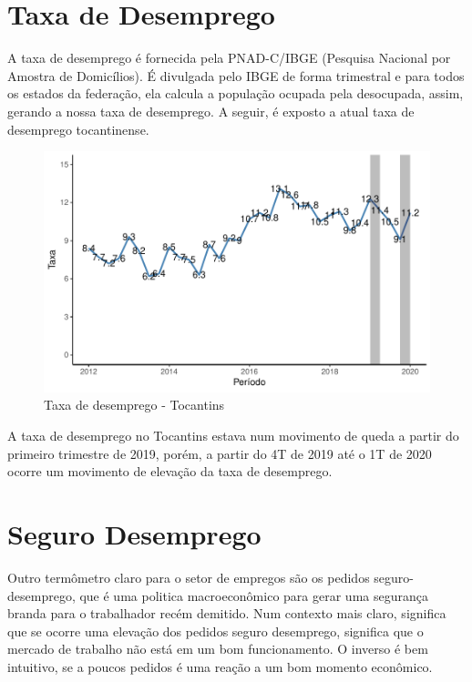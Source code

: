 \section{Taxa de Desemprego}

\par A taxa de desemprego é fornecida pela PNAD-C/IBGE (Pesquisa Nacional por Amostra de Domicílios). É divulgada pelo IBGE de forma trimestral e para todos os estados da federação, ela calcula a população ocupada pela desocupada, assim, gerando a nossa taxa de desemprego. A seguir, é exposto a atual taxa de desemprego tocantinense.

\begin{figure}[h]
	\caption{Taxa de desemprego - Tocantins}
	\includegraphics[width=\linewidth]{fig/taxa de desemprego - Tocantins.pdf}
\end{figure}

\par A taxa de desemprego no Tocantins estava num movimento de queda a partir do primeiro trimestre de 2019, porém, a partir do 4T de 2019 até o 1T de 2020 ocorre um movimento de elevação da taxa de desemprego.

\section{Seguro Desemprego}

\par Outro termômetro claro para o setor de empregos são os pedidos seguro-desemprego, que é uma politica macroeconômico para gerar uma segurança branda para o trabalhador recém demitido. Num contexto mais claro, significa que se ocorre uma elevação dos pedidos seguro desemprego, significa que o mercado de trabalho não está em um bom funcionamento. O inverso é bem intuitivo, se a poucos pedidos é uma reação a um bom momento econômico.

